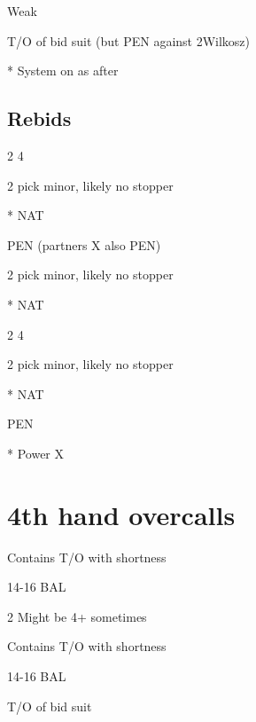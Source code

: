\documentclass[12pt, a4paper]{article}
\begin{document}
\compsequence{{2\diams\alrt}{\dbl\alrt}{2\major\alrt}}
\begin{compoptions}[4]
    \item[\pass] Weak
    \item[\dbl] T/O of bid suit (but PEN against 2\diams Wilkosz)
    \item[*] System on as after \rdbl 
\end{compoptions}



\subsection*{Rebids}
\begin{compoptions}[2]
    \item[2\spades] 4\spades\ \nf
    \item[2\nt] pick minor, likely no stopper 
    \item[*] NAT \nf
\end{compoptions}

\compsequence{{2\diams\alrt}{\dbl\alrt}{2\hearts\alrt}{\dbl}{2\spades}}
\begin{compoptions}[2]
    \item[\dbl] PEN (partners X also PEN)
    \item[2\nt] pick minor, likely no stopper 
    \item[*] NAT \nf
\end{compoptions}

\begin{compoptions}[2]
    \item[2\spades] 4\spades\ \nf
    \item[2\nt] pick minor, likely no stopper 
    \item[*] NAT \nf
\end{compoptions}

\begin{compoptions}[2]
    \item[\dbl] PEN
    \item[*] Power X
\end{compoptions}


\section*{4th hand overcalls}
\begin{compoptions}[4]
    \item[\pass] Contains T/O with \spades shortness
    \item[\dbl] 14-16 BAL
    \item[2\spades] Might be 4+ sometimes  
\end{compoptions}

\begin{compoptions}[4]
    \item[\pass] Contains T/O with \hearts shortness
    \item[\dbl] 14-16 BAL
\end{compoptions}

\begin{compoptions}[4]
    \item[\dbl] T/O of bid suit
\end{compoptions}
\end{document}
